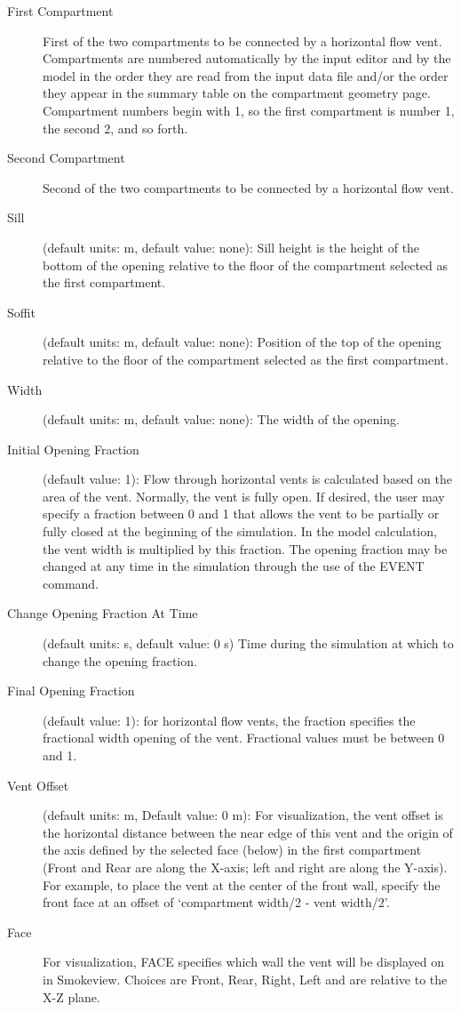 \begin{description}
\item[First Compartment] First of the two compartments to be connected by a horizontal flow vent.  Compartments are numbered automatically by the input editor and by the model in the order they are read from the input data file and/or the order they appear in the summary table on the compartment geometry page. Compartment numbers begin with 1, so the first compartment is number 1, the second 2, and so forth.

\item[Second Compartment] Second of the two compartments to be connected by a horizontal flow vent.

\item[Sill] (default units: m, default value: none): Sill height is the height of the bottom of the opening relative to the floor of the compartment selected as the first compartment.

\item[Soffit] (default units: m, default value: none): Position of the top of the opening relative to the floor of the compartment selected as the first compartment.

\item[Width] (default units: m, default value: none): The width of the opening.

\item[Initial Opening Fraction] (default value: 1): Flow through horizontal vents is calculated based on the area of the vent.  Normally, the vent is fully open.  If desired, the user may specify a fraction between 0 and 1 that allows the vent to be partially or fully closed at the beginning of the simulation.  In the model calculation, the vent width is multiplied by this fraction.  The opening fraction may be changed at any time in the simulation through the use of the EVENT command.

\item[Change Opening Fraction At Time]  (default units: s, default value: 0 s)  Time during the simulation at which to change the opening fraction.

\item[Final Opening Fraction] (default value: 1): for horizontal flow vents, the fraction specifies the fractional width opening of the vent. Fractional values must be between 0 and 1.

\item[Vent Offset] (default units: m, Default value: 0 m): For visualization, the vent offset is the horizontal distance between the near edge of this vent and the origin of the axis defined by the selected face (below) in the first compartment (Front and Rear are along the X-axis; left and right are along the Y-axis). For example, to place the vent at the center of the front wall, specify the front face at an offset of `compartment width/2 - vent width/2'.

\item[Face] For visualization, FACE specifies which wall the vent will be displayed on in Smokeview.  Choices are Front, Rear, Right, Left and are relative to the X-Z plane.
\end{description}

